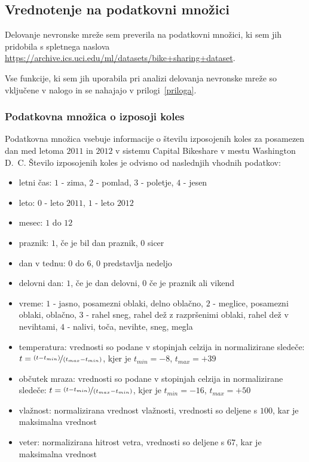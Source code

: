 \documentclass[mat1]{fmfdelo}
\begin{document}
\subsection{Vrednotenje na podatkovni množici}
Delovanje nevronske mreže sem preverila na podatkovni množici, ki sem jih pridobila s spletnega naslova \url{https://archive.ics.uci.edu/ml/datasets/bike+sharing+dataset}.

 Vse fun\-kci\-je, ki sem jih uporabila pri analizi delovanja nevronske mreže so vključene v nalogo in se nahajajo v prilogi~\ref{priloga}.
%
\subsubsection{Podatkovna množica o izposoji koles}
Podatkovna množica vsebuje informacije o številu izposojenih koles za posamezen dan med letoma $2011$ in $2012$ v sistemu Capital Bikeshare v mestu Washington D.~C. Število izposojenih koles je odvisno od naslednjih vhodnih podatkov: 
\begin{itemize}
	\item letni čas: $1$ - zima, $2$ - pomlad, $3$ - poletje, $4$ - jesen
	\item leto: $0$ - leto $2011$, $1$ - leto $2012$
	\item mesec: $1$ do $12$
	\item praznik: $1$, če je bil dan praznik, $0$ sicer
	\item dan v tednu: $0$ do $6$, $0$ predstavlja nedeljo
	\item delovni dan: $1$, če je dan delovni, $0$ če je praznik ali vikend
	\item vreme: $1$ - jasno, posamezni oblaki, delno oblačno, $2$ - meglice, posamezni oblaki, oblačno,  $3$ - rahel sneg, rahel dež z razpršenimi oblaki, rahel dež v nevihtami, $4$ - nalivi, toča, nevihte, sneg, megla
	\item temperatura: vrednosti so podane v stopinjah celzija in normalizirane sledeče: $t=\nicefrac{(t-t_{min})}{(t_{max}-t_{min})}$, kjer je $t_{min}=-8$, $t_{max}=+39$
	\item občutek mraza: vrednosti so podane v stopinjah celzija in normalizirane sledeče: $t=\nicefrac{(t-t_{min})}{(t_{max}-t_{min})}$, kjer je $t_{min}=-16$, $t_{max}=+50$
	\item vlažnost: normalizirana vrednost vlažnosti, vrednosti so deljene s $100$, kar je maksimalna vrednost
	\item veter: normalizirana hitrost vetra, vrednosti so deljene s $67$, kar je maksimalna vrednost
\end{itemize}
\end{document}
